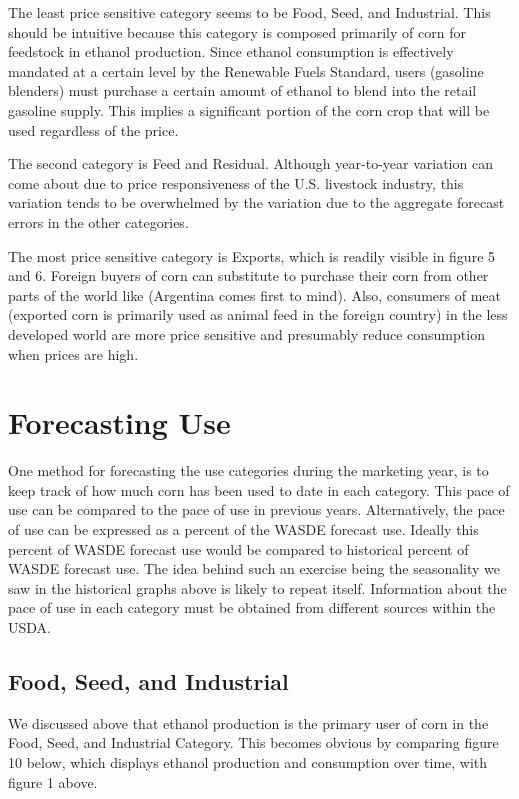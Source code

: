 \documentclass[
]{book}
\begin{document}
The least price sensitive category seems to be Food, Seed, and Industrial. This should be intuitive because this category is composed primarily of corn for feedstock in ethanol production. Since ethanol consumption is effectively mandated at a certain level by the Renewable Fuels Standard, users (gasoline blenders) must purchase a certain amount of ethanol to blend into the retail gasoline supply. This implies a significant portion of the corn crop that will be used regardless of the price.

The second category is Feed and Residual. Although year-to-year variation can come about due to price responsiveness of the U.S. livestock industry, this variation tends to be overwhelmed by the variation due to the aggregate forecast errors in the other categories.

The most price sensitive category is Exports, which is readily visible in figure 5 and 6. Foreign buyers of corn can substitute to purchase their corn from other parts of the world like (Argentina comes first to mind). Also, consumers of meat (exported corn is primarily used as animal feed in the foreign country) in the less developed world are more price sensitive and presumably reduce consumption when prices are high.

\hypertarget{forecasting-use}{%
\section{Forecasting Use}\label{forecasting-use}}

One method for forecasting the use categories during the marketing year, is to keep track of how much corn has been used to date in each category. This pace of use can be compared to the pace of use in previous years. Alternatively, the pace of use can be expressed as a percent of the WASDE forecast use. Ideally this percent of WASDE forecast use would be compared to historical percent of WASDE forecast use. The idea behind such an exercise being the seasonality we saw in the historical graphs above is likely to repeat itself. Information about the pace of use in each category must be obtained from different sources within the USDA.

\hypertarget{food-seed-and-industrial}{%
\subsection{Food, Seed, and Industrial}\label{food-seed-and-industrial}}

We discussed above that ethanol production is the primary user of corn in the Food, Seed, and Industrial Category. This becomes obvious by comparing figure 10 below, which displays ethanol production and consumption over time, with figure 1 above.
\end{document}
